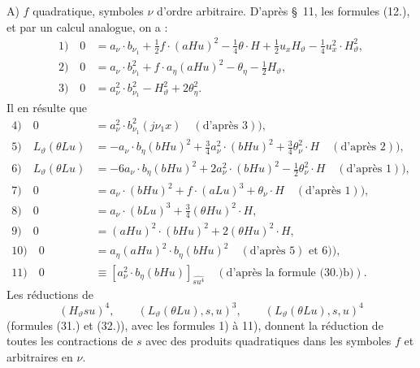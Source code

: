 \documentclass[11pt]{article}
\begin{document}
A) $f$ quadratique, symboles $\nu$ d'ordre arbitraire. D'après \S\ 11, les formules (12.), et par un calcul analogue, on a :
\begin{align*}
1)\quad 0&=a_\nu\cdot b_{\nu_1}+\frac12f\cdot(aHu)^2-\frac14\theta\cdot H+\frac12u_xH_\vartheta-\frac14u_x^2\cdot H_\vartheta^2,\\
2)\quad 0&=a_\nu\cdot b_{\nu_1}^2+f\cdot a_\eta(aHu)^2-\theta_\eta-\frac12H_\vartheta,\\
3)\quad 0&=a_\nu^2\cdot b_{\nu_1}^2-H_\vartheta^2+2\theta_\eta^2.
\end{align*}
Il en résulte que
\begin{align*}
4)\quad 0&=a_\nu^2\cdot b_{\nu_1}^2(j\nu_1x)\quad(\text{d'après }3)),\\
5)\quad L_\vartheta(\theta Lu)&=-a_\nu\cdot b_\eta(bHu)^2+\frac34a_\nu^2\cdot(bHu)^2+\frac34\theta_\nu^2\cdot H\quad(\text{d'après }2)),\\
6)\quad L_\vartheta(\theta Lu)&=-6a_\nu\cdot b_\eta(bHu)^2+2a_\nu^2\cdot(bHu)^2-\frac12\theta_\nu^2\cdot H\quad(\text{d'après }1)),\\
7)\quad 0&=a_\nu\cdot(bHu)^2+f\cdot(aLu)^3+\theta_\nu\cdot H\quad(\text{d'après }1)),\\
8)\quad 0&=a_\nu\cdot(bLu)^3+\frac34(\theta Hu)^2\cdot H,\\
9)\quad 0&=(aHu)^2\cdot(bHu)^2+2(\theta Hu)^2\cdot H,\\
10)\quad 0&=a_\eta(aHu)^2\cdot b_\eta(bHu)^2\quad(\text{d'après }5)\text{ et }6)),\\
11)\quad 0&\equiv [a_\nu^2\cdot b_\eta(bHu)]_{\widehat{su^4}}\quad(\text{d'après la formule (30.)b)}).
\end{align*}
Les réductions de
\[
(H_\vartheta su)^4,
\qquad (L_\vartheta(\theta Lu),s,u)^3,
\qquad (L_\vartheta(\theta Lu),s,u)^4
\]
(formules (31.) et (32.)), avec les formules 1) à 11), donnent la réduction de toutes les contractions de $s$ avec des produits quadratiques dans les symboles $f$ et arbitraires en $\nu$.
\end{document}
